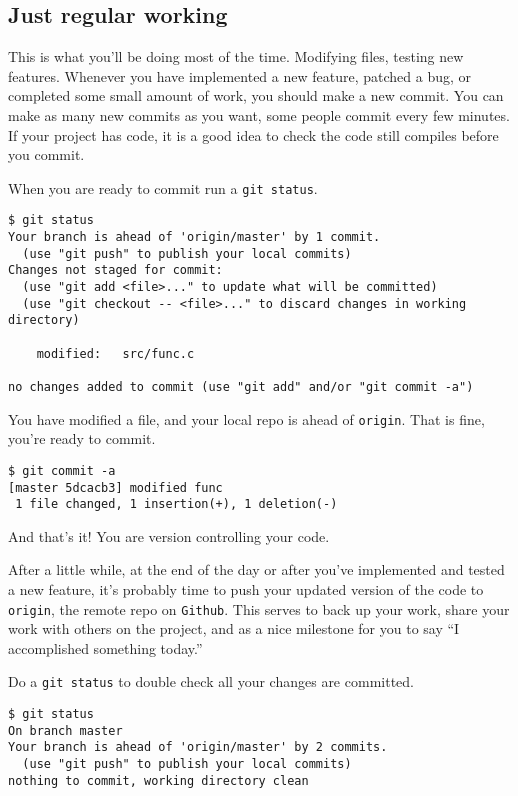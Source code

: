 \documentclass[14pt]{amsart}
\newcommand{\github}{{\texttt{Github}}}
\begin{document}
\subsection{Just regular working}

This is what you'll be doing most of the time.  Modifying files, testing new features. Whenever you have implemented a new feature, patched a bug, or completed some small amount of work, you should make a new commit.  You can make as many new commits as you want, some people commit every few minutes.  If your project has code, it is a good idea to check the code still compiles before you commit.

When you are ready to commit run a \texttt{git status}.

\begin{lstlisting}
$ git status
Your branch is ahead of 'origin/master' by 1 commit.
  (use "git push" to publish your local commits)
Changes not staged for commit:
  (use "git add <file>..." to update what will be committed)
  (use "git checkout -- <file>..." to discard changes in working directory)

	modified:   src/func.c

no changes added to commit (use "git add" and/or "git commit -a")
\end{lstlisting}
You have modified a file, and your local repo is ahead of \texttt{origin}.  That is fine, you're ready to commit.
\begin{lstlisting}
$ git commit -a
[master 5dcacb3] modified func
 1 file changed, 1 insertion(+), 1 deletion(-)
\end{lstlisting}
And that's it!  You are version controlling your code.

After a little while, at the end of the day or after you've implemented and tested a new feature, it's probably time to push your updated version of the code to \texttt{origin}, the remote repo on \github.  This serves to back up your work, share your work with others on the project, and as a nice milestone for you to say ``I accomplished something today.''  

Do a \texttt{git status} to double check all your changes are committed.

\begin{lstlisting}
$ git status
On branch master
Your branch is ahead of 'origin/master' by 2 commits.
  (use "git push" to publish your local commits)
nothing to commit, working directory clean
\end{lstlisting}
\end{document}
